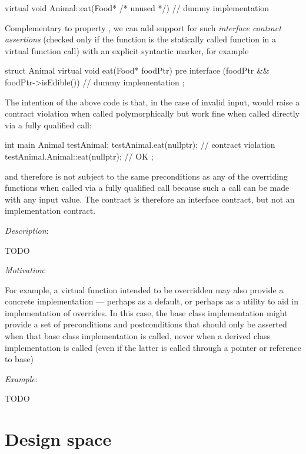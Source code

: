 \begin{codeblock}
virtual void Animal::eat(Food* /* unused */) {
  // dummy implementation
}
\end{codeblock}

Complementary to property , we can add support for such \emph{interface contract assertions} (checked only if the function is the statically called function in a virtual function call) with an explicit syntactic marker, for example

\begin{codeblock}
struct Animal {
  virtual void eat(Food* foodPtr)
    pre interface (foodPtr && foodPtr->isEdible()) {
      // dummy implementation
    }
};
\end{codeblock}

The intention of the above code is that, in the case of invalid input,  would raise a contract violation when called polymorphically but work fine when called directly via a fully qualified call:
\begin{codeblock}
int main {
  Animal testAnimal;
  testAnimal.eat(nullptr);  // contract violation
  testAnimal.Animal::eat(nullptr); // OK
};
\end{codeblock}

 and therefore is not subject to the same
preconditions as any of the overriding functions when called via a fully qualified call because such a
call can be made with any input value. The contract is therefore an interface contract, but not an
implementation contract.



\emph{Description}:

TODO

\emph{Motivation}:

For example, a virtual function intended to be overridden may also provide a concrete implementation — perhaps as a default, or perhaps as a utility to aid in implementation of overrides. In this case, the base class implementation might provide a set of preconditions and postconditions that should only be asserted when that base class implementation is called, never when a derived class implementation
is called (even if the latter is called through a pointer or reference to base)

\emph{Example}:

TODO

\section{Design space}
\label{designs}

